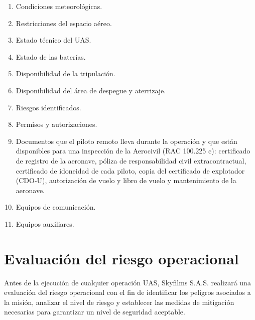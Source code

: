 \begin{enumerate}

\item Condiciones meteorológicas.

\item Restricciones del espacio aéreo.

\item Estado técnico del UAS.

\item Estado de las baterías.

\item Disponibilidad de la tripulación.

\item Disponibilidad del área de despegue y aterrizaje.

\item Riesgos identificados.

\item Permisos y autorizaciones.

\item Documentos que el piloto remoto lleva durante la operación y que están disponibles para una inspección de la Aerocivil (RAC 100.225 c): certificado de registro de la aeronave, póliza de responsabilidad civil extracontractual, certificado de idoneidad de cada piloto, copia del certificado de explotador (CDO-U), autorización de vuelo y libro de vuelo y mantenimiento de la aeronave.

\item Equipos de comunicación.

\item Equipos auxiliares.

\end{enumerate}








\section{Evaluación del riesgo operacional}

Antes de la ejecución de cualquier operación UAS, Skyfilms S.A.S. realizará una evaluación del riesgo operacional con el fin de identificar los peligros asociados a la misión, analizar el nivel de riesgo y establecer las medidas de mitigación necesarias para garantizar un nivel de seguridad aceptable.

